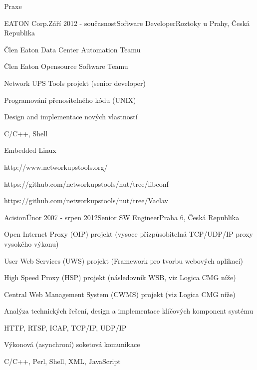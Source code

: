 \documentclass{resume} %
\begin{document}
\begin{rSection}{Praxe}

\begin{rSubsection}{EATON Corp.}{Z\'{a}\v{r}\'{i} 2012 - sou\v{c}asnost}{Software Developer}{Roztoky u Prahy, \v{C}esk\'{a} Republika}
\item \v{C}len Eaton Data Center Automation Teamu
\item \v{C}len Eaton Opensource Software Teamu
\item Network UPS Tools projekt (senior developer)
\item Programov\'{a}n\'{i} p\v{r}enositeln\'{e}ho k\'{o}du (UNIX)
\item Design and implementace nov\'{y}ch vlastnost\'{i}
\item C/C++, Shell
\item Embedded Linux
\item http://www.networkupstools.org/
\item https://github.com/networkupstools/nut/tree/libconf
\item https://github.com/networkupstools/nut/tree/Vaclav
\end{rSubsection}


\begin{rSubsection}{Acision}{\'{U}nor 2007 - srpen 2012}{Senior SW Engineer}{Praha 6, \v{C}esk\'{a} Republika}
\item Open Internet Proxy (OIP) projekt (vysoce p\v{r}izp\r{u}sobiteln\'{a} TCP/UDP/IP proxy vysok\'{e}ho v\'{y}konu)
\item User Web Services (UWS) projekt (Framework pro tvorbu webov\'{y}ch aplikac\'{i})
\item High Speed Proxy (HSP) projekt (n\'{a}sledovn\'{i}k WSB, viz Logica CMG n\'{i}\v{z}e)
\item Central Web Management System (CWMS) projekt (viz Logica CMG n\'{i}\v{z}e)
\item Anal\'{y}za technick\'{y}ch \v{r}e\v{s}en\'{i}, design a implementace kl\'{i}\v{c}ov\'{y}ch komponent syst\'{e}mu
\item HTTP, RTSP, ICAP, TCP/IP, UDP/IP
\item V\'{y}konov\'{a} (asynchron\'{i}) soketov\'{a} komunikace
\item C/C++, Perl, Shell, XML, JavaScript
\end{rSubsection}



\end{rSection}
\end{document}
